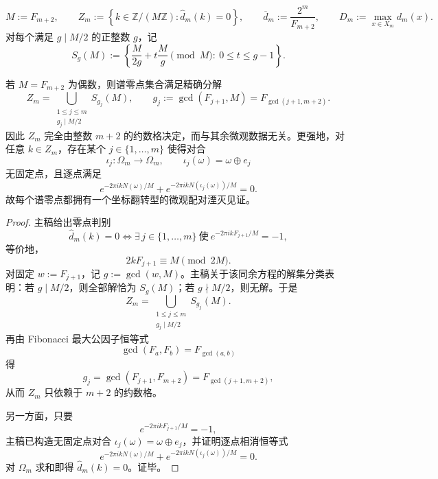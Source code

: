 \[
M:=F_{m+2},
\qquad
Z_m:=\left\{k\in \mathbb Z/(M\mathbb Z):\widehat d_m(k)=0\right\},
\qquad
\overline d_m:=\frac{2^m}{F_{m+2}},
\qquad
D_m:=\max_{x\in X_m}d_m(x).
\]
对每个满足 \(g\mid M/2\) 的正整数 \(g\)，记
\[
S_g(M):=
\left\{
\frac{M}{2g}+t\frac{M}{g}\pmod M:\ 0\le t\le g-1
\right\}.
\]

\begin{theorem}\label{thm:conclusion-fold-zero-divisor-lattice-involution-witness}
若 \(M=F_{m+2}\) 为偶数，则谱零点集合满足精确分解
\[
Z_m=
\bigcup_{\substack{1\le j\le m\\ g_j\mid M/2}}S_{g_j}(M),
\qquad
g_j:=\gcd(F_{j+1},M)=F_{\gcd(j+1,m+2)}.
\]
因此 \(Z_m\) 完全由整数 \(m+2\) 的约数格决定，而与其余微观数据无关。更强地，对任意 \(k\in Z_m\)，存在某个 \(j\in\{1,\dots,m\}\) 使得对合
\[
\iota_j:\Omega_m\to\Omega_m,
\qquad
\iota_j(\omega)=\omega\oplus e_j
\]
无固定点，且逐点满足
\[
e^{-2\pi i kN(\omega)/M}+e^{-2\pi i kN(\iota_j(\omega))/M}=0.
\]
故每个谱零点都拥有一个坐标翻转型的微观配对湮灭见证。
\end{theorem}
\begin{proof}
主稿给出零点判别
\[
\widehat d_m(k)=0
\iff
\exists\, j\in\{1,\dots,m\}\ \text{使}\ e^{-2\pi i kF_{j+1}/M}=-1,
\]
等价地，
\[
2kF_{j+1}\equiv M\pmod{2M}.
\]
对固定 \(w:=F_{j+1}\)，记 \(g:=\gcd(w,M)\)。主稿关于该同余方程的解集分类表明：若 \(g\mid M/2\)，则全部解恰为 \(S_g(M)\)；若 \(g\nmid M/2\)，则无解。于是
\[
Z_m=
\bigcup_{\substack{1\le j\le m\\ g_j\mid M/2}}S_{g_j}(M).
\]
再由 Fibonacci 最大公因子恒等式
\[
\gcd(F_a,F_b)=F_{\gcd(a,b)}
\]
得
\[
g_j=\gcd(F_{j+1},F_{m+2})=F_{\gcd(j+1,m+2)},
\]
从而 \(Z_m\) 只依赖于 \(m+2\) 的约数格。

另一方面，只要
\[
e^{-2\pi i kF_{j+1}/M}=-1,
\]
主稿已构造无固定点对合 \(\iota_j(\omega)=\omega\oplus e_j\)，并证明逐点相消恒等式
\[
e^{-2\pi i kN(\omega)/M}+e^{-2\pi i kN(\iota_j(\omega))/M}=0.
\]
对 \(\Omega_m\) 求和即得 \(\widehat d_m(k)=0\)。证毕。
\end{proof}


